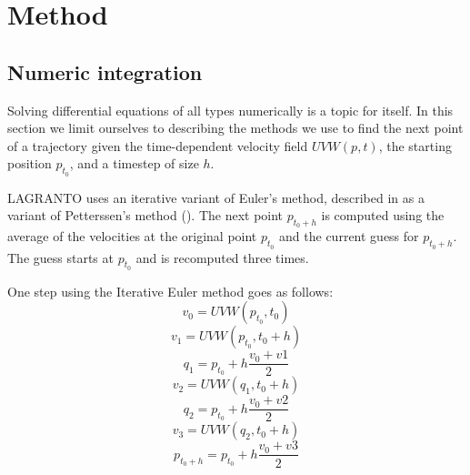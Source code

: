 \chapter{Method}

\section{Numeric integration}\label{sec:integrator}
Solving differential equations of all types numerically is a topic for itself. In this section we limit ourselves to describing the methods we use to find the next point of a trajectory given the time-dependent velocity field $UVW(p,t)$, the starting position $p_{t_0}$, and a timestep of size $h$.

LAGRANTO uses an iterative variant of Euler's method, described in \cite{src:lagranto_v1} as a variant of Petterssen's method (\cite{src:petterssen}). The next point $p_{t_0+h}$ is computed using the average of the velocities at the original point $p_{t_0}$ and the current guess for $p_{t_0+h}$. The guess starts at $p_{t_0}$ and is recomputed three times.


% 

One step using the Iterative Euler method goes as follows:
\begin{equation}
	v_0 = UVW(p_{t_0}, t_0)
\end{equation}
\begin{equation}
	v_1 = UVW(p_{t_0}, t_0 + h)
\end{equation}
\begin{equation}
	q_1 = p_{t_0} + h \frac{ v_0  + v1}{2}
\end{equation}
\begin{equation}
	v_2 = UVW(q_1, t_0 + h)
\end{equation}
\begin{equation}
	q_2 = p_{t_0} + h \frac{ v_0  + v2}{2}
\end{equation}
\begin{equation}
	v_3 = UVW(q_2, t_0 + h)
\end{equation}
\begin{equation}
	p_{t_0 + h} = p_{t_0} + h \frac{ v_0  + v3}{2}
\end{equation}

